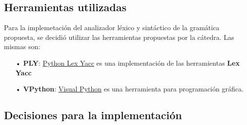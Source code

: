 \subsection{Herramientas utilizadas}

Para la implemetaci\'on del analizador l\'exico y sint\'actico de la gram\'atica propuesta, se decidi\'o utilizar las herramientas propuestas por la c\'atedra. Las mismas son:

\begin{itemize}

\item[•] \textbf{PLY}: \href{http://www.dabeaz.com/ply/}{Python Lex Yacc} es una implementaci\'on de las herramientas \textbf{Lex} \textbf{Yacc}

\item[•] \textbf{VPython}: \href{http://vpython.org/index.html}{Visual Python} es una herramienta para programaci\'on gr\'afica.

\end{itemize}

\subsection{Decisiones para la implementaci\'on}


